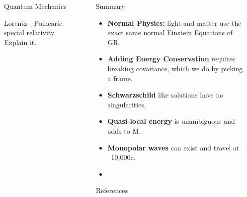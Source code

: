 \documentclass[final]{beamer}
\newlength{\sepwidth}
\newlength{\colwidth}
\newcommand{\separatorcolumn}{\begin{column}{\sepwidth}\end{column}}
\begin{document}
\begin{frame}[t]
\begin{columns}[t]
\begin{column}{\colwidth}
\begin{block}{Quantum Mechanics}
\begin{alertblock}{Lorentz - Poincarie special relativity}
Explain it.
\end{alertblock} 
   
\end{block}



\end{column}
\separatorcolumn

\begin{column}{\colwidth}

  \begin{alertblock}{Summary}
    \begin{itemize}
      \item \textbf{Normal Physics:} light and matter use the exact same normal Einstein Equations of GR.
      \item \textbf{Adding Energy Conservation} requires breaking covariance, which we do by picking a frame.
      \item \textbf{Schwarzschild} like solutions have no singularities.
       \item \textbf{Quasi-local energy} is unambiguous and adds to M.
       \item \textbf{Monopolar waves} can exist and travel at ~10,000c.
       \item 
       
    \end{itemize}
  \end{alertblock}

\begin{block}{References}
\printbibliography
\end{block}

\end{column}


\separatorcolumn
\end{columns}
\end{frame}
\end{document}
